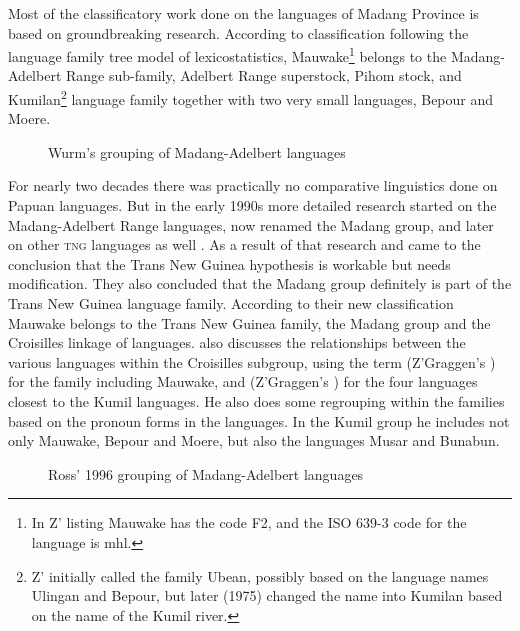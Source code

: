Most of the classificatory work done on the languages of Madang Province is based on \citet{ZGraggen1971,ZGraggen1975} groundbreaking research.  According to  classification following the language family tree model of lexicostatistics, Mauwake\footnote{In Z' listing Mauwake has the code F2, and the ISO 639-3 code for the language is mhl.} belongs to the Madang-Adelbert Range sub-family, Adelbert Range superstock, Pihom stock, and Kumilan\footnote{Z'\citet{Graggen1971} initially called the family Ubean, possibly based on the language names Ulingan and Bepour, but later (1975) changed the name into Kumilan based on the name of the Kumil river.} language family together with two very small languages, Bepour and Moere. 




\begin{figure}
\caption{Wurm's grouping of Madang-Adelbert languages \citep [Map~3]{Ross1996}}
\label{map:3:MadangWurm}
\end{figure}

For nearly two decades there was practically no comparative linguistics done on Papuan languages.  But in the early 1990s more detailed research started on the Madang-Adelbert Range languages, now renamed the Madang group, and later on other \textsc{tng} languages as well \citep{Pawley1998}. As a result of that research \citet{Pawley1995, Pawley2001} and \citet{Ross1995} came to the conclusion that the Trans New Guinea hypothesis is workable but needs modification. They also concluded that the Madang group definitely is part of the Trans New Guinea language family. According to their new classification Mauwake belongs to the Trans New Guinea family, the Madang group and the Croisilles linkage of languages. \citet[21--25]{Ross1996} also discusses the relationships between the various languages within the Croisilles subgroup, using the term  (Z'Graggen's   ) for the family including Mauwake, and  (Z'Graggen's  ) for the four languages closest to the Kumil languages. He also does some regrouping within the families based on the pronoun  forms in the languages.  In the Kumil group he includes not only Mauwake, Bepour and Moere, but also the languages Musar and Bunabun. 



\begin{figure}
\caption{Ross' 1996 grouping of Madang-Adelbert languages \citep[Map~4]{Ross1996}}
\label{map:4:MadangRoss}
\end{figure}


